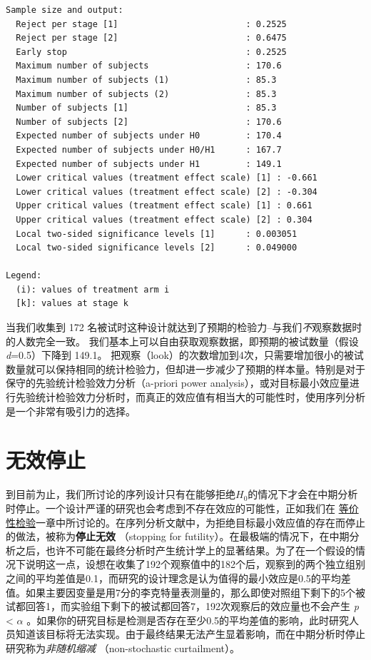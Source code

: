 \documentclass[
  letterpaper,
  DIV=11,
  numbers=noendperiod]{scrreprt}
\begin{document}
\begin{verbatim}
Sample size and output:
  Reject per stage [1]                         : 0.2525 
  Reject per stage [2]                         : 0.6475 
  Early stop                                   : 0.2525 
  Maximum number of subjects                   : 170.6 
  Maximum number of subjects (1)               : 85.3 
  Maximum number of subjects (2)               : 85.3 
  Number of subjects [1]                       : 85.3 
  Number of subjects [2]                       : 170.6 
  Expected number of subjects under H0         : 170.4 
  Expected number of subjects under H0/H1      : 167.7 
  Expected number of subjects under H1         : 149.1 
  Lower critical values (treatment effect scale) [1] : -0.661 
  Lower critical values (treatment effect scale) [2] : -0.304 
  Upper critical values (treatment effect scale) [1] : 0.661 
  Upper critical values (treatment effect scale) [2] : 0.304 
  Local two-sided significance levels [1]      : 0.003051 
  Local two-sided significance levels [2]      : 0.049000 

Legend:
  (i): values of treatment arm i
  [k]: values at stage k
\end{verbatim}

当我们收集到 172
名被试时这种设计就达到了预期的检验力--与我们\emph{不}观察数据时的人数完全一致。
我们基本上可以自由获取观察数据，即预期的被试数量（假设\emph{d}=0.5）下降到
149.1。
把观察（look）的次数增加到4次，只需要增加很小的被试数量就可以保持相同的统计检验力，但却进一步减少了预期的样本量。特别是对于保守的先验统计检验效力分析（a-priori
power
analysis），或对目标最小效应量进行先验统计检验效力分析时，而真正的效应值有相当大的可能性时，使用序列分析是一个非常有吸引力的选择。

\hypertarget{ux65e0ux6548ux505cux6b62}{%
\section{无效停止}\label{ux65e0ux6548ux505cux6b62}}

到目前为止，我们所讨论的序列设计只有在能够拒绝\(H_0\)的情况下才会在中期分析时停止。一个设计严谨的研究也会考虑到不存在效应的可能性，正如我们在
\protect\hyperlink{equivalencetest}{等价性检验}一章中所讨论的。在序列分析文献中，为拒绝目标最小效应值的存在而停止的做法，被称为\textbf{停止无效}
（stopping for
futility）。在最极端的情况下，在中期分析之后，也许不可能在最终分析时产生统计学上的显著结果。为了在一个假设的情况下说明这一点，设想在收集了192个观察值中的182个后，观察到的两个独立组别之间的平均差值是0.1，而研究的设计理念是认为值得的最小效应是0.5的平均差值。如果主要因变量是用7分的李克特量表测量的，那么即使对照组下剩下的5个被试都回答1，而实验组下剩下的被试都回答7，192次观察后的效应量也不会产生
\emph{p} \textless{} \(\alpha\)
。如果你的研究目标是检测是否存在至少0.5的平均差值的影响，此时研究人员知道该目标将无法实现。由于最终结果无法产生显着影响，而在中期分析时停止研究称为\emph{非随机缩减}
（non-stochastic curtailment）。
\end{document}
